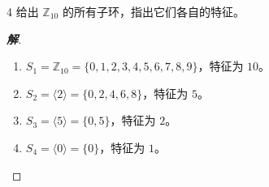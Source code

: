 \documentclass[12pt, a4paper]{article}
\newenvironment{solution}{
    \begin{proof}[\textbf{解}]
}{
    \end{proof}
}
\begin{document}
\begin{problem}{4}
    给出 $\mathbb{Z}_{10}$ 的所有子环，指出它们各自的特征。
\end{problem}
\begin{solution}
    \begin{enumerate}[1.]
        \item $S_1 = \mathbb{Z}_{10} = \{0, 1, 2, 3, 4, 5, 6, 7, 8, 9\}$，特征为 $10$。
        \item $S_2 = \langle 2 \rangle = \{0, 2, 4, 6, 8\}$，特征为 $5$。
        \item $S_3 = \langle 5 \rangle = \{0, 5\}$，特征为 $2$。
        \item $S_4 = \langle 0 \rangle = \{0\}$，特征为 $1$。
    \end{enumerate}
\end{solution}
\end{document}
